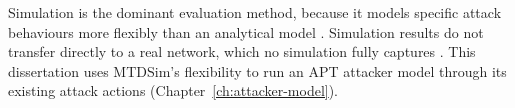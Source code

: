 \documentclass{cshonours}
\begin{document}
Simulation is the dominant evaluation method, because it models specific
attack behaviours more flexibly than an analytical model \citep{cho2020}.
Simulation results do not transfer directly to a real network, which no
simulation fully captures \citep{cho2020}. This dissertation uses MTDSim's
flexibility to run an APT attacker model through its existing attack
actions (Chapter~\ref{ch:attacker-model}).
\end{document}
